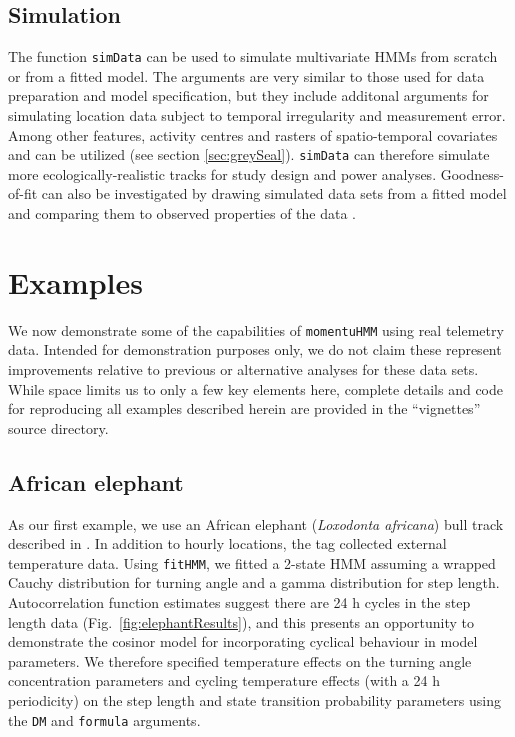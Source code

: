 \documentclass[12pt]{article}\usepackage[]{graphicx}\usepackage[]{color}
\begin{document}
\subsection{Simulation}
The function \verb|simData| can be used to simulate multivariate HMMs from scratch or from a fitted model. The arguments are very similar to those used for data preparation and model specification, but they include additonal arguments for simulating location data subject to temporal irregularity and measurement error. Among other features, activity centres and rasters of spatio-temporal covariates and can be utilized (see section \ref{sec:greySeal}). \verb|simData| can therefore simulate more ecologically-realistic tracks %
for study design and power analyses. Goodness-of-fit can also be investigated by drawing simulated data sets from a fitted model and comparing them to observed properties of the data \citep{MoralesEtAl2004}.
  
\section{Examples}
\label{sec:example}
We now demonstrate some of the capabilities of \verb|momentuHMM| using real telemetry data. Intended for demonstration purposes only, we do not claim these represent improvements relative to previous or alternative analyses for these data sets. While space limits us to only a few key elements here, complete details and code for reproducing all examples described herein are provided in the ``vignettes'' source directory.


\subsection{African elephant}
\label{sec:elephant}
As our first example, we use an African elephant ({\it Loxodonta africana}) bull track described in \cite{WallEtAl2014}%
. In addition to hourly locations, the tag collected external temperature data. %
Using \verb|fitHMM|, we fitted a 2-state HMM assuming a wrapped Cauchy distribution for turning angle and a gamma distribution for step length. Autocorrelation function estimates suggest there are 24 h cycles in the step length data (Fig.\ \ref{fig:elephantResults}), and this presents an opportunity to demonstrate the cosinor model for incorporating cyclical behaviour in model parameters. We therefore specified temperature effects on the turning angle concentration parameters and cycling temperature effects (with a 24 h periodicity) on the step length and state transition probability parameters using the \verb|DM| and \verb|formula| arguments. 
\end{document}
